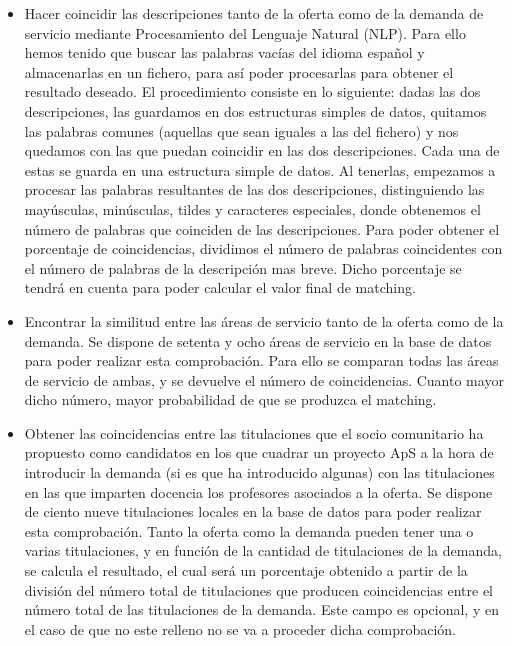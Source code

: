 \documentclass[11pt]{book}
\begin{document}
\begin{itemize} 	
	\item Hacer coincidir las descripciones tanto de la oferta como de la demanda de servicio mediante Procesamiento del Lenguaje Natural (NLP).
	Para ello hemos tenido que buscar las palabras vacías del idioma español y almacenarlas en un fichero, para así poder  procesarlas para obtener el resultado deseado. El procedimiento consiste en lo siguiente: dadas las dos descripciones, las guardamos en dos estructuras simples de datos, quitamos las palabras comunes (aquellas que sean iguales a las del fichero) y nos quedamos con las que puedan coincidir en las dos descripciones. Cada una de estas se guarda en una estructura simple de datos. Al tenerlas, empezamos a procesar las palabras resultantes de las dos descripciones, distinguiendo las mayúsculas, minúsculas, tildes y caracteres especiales, donde obtenemos el número de palabras que coinciden de las descripciones. Para poder obtener el porcentaje de coincidencias, dividimos el número de palabras coincidentes con el número de palabras de la descripción mas breve. Dicho porcentaje se tendrá en cuenta para poder calcular el valor final de matching.
	
	\item Encontrar la similitud entre las áreas de servicio tanto de la oferta como de la demanda. Se dispone de setenta y ocho áreas de servicio en la base de datos para poder realizar esta comprobación. Para ello se comparan todas las áreas de servicio de ambas, y se devuelve el número de coincidencias. Cuanto mayor dicho número, mayor probabilidad de que se produzca el matching.
	
	\item Obtener las coincidencias entre las titulaciones que el socio
	comunitario ha propuesto como candidatos en los que cuadrar un proyecto
	ApS a la hora de introducir la demanda (si es que ha introducido algunas) con las titulaciones en las que imparten docencia los profesores asociados a la oferta. 
	Se dispone de ciento nueve titulaciones locales en la base de datos para poder realizar esta comprobación. Tanto la oferta como la demanda pueden tener una o varias titulaciones, y en función de la cantidad de titulaciones de la demanda, se calcula el resultado, el cual será un porcentaje obtenido a partir de la división del número total de titulaciones que producen coincidencias entre el  número total de las titulaciones de la demanda. Este campo es opcional, y en el caso de que no este relleno no se va a proceder dicha comprobación.
	

\end{itemize}
\end{document}
